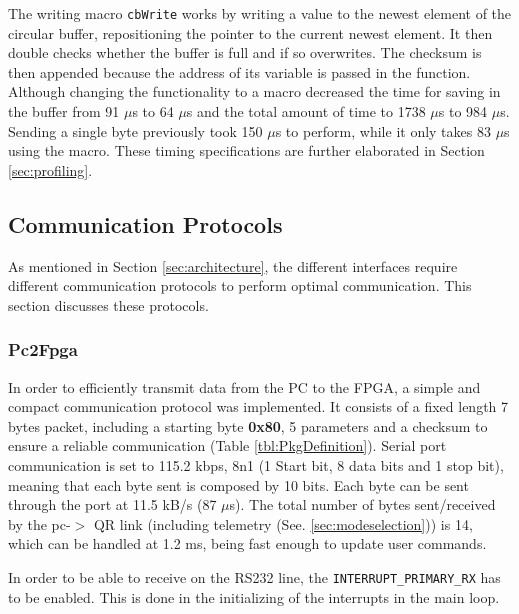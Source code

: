 \documentclass{article}
\begin{document}
The writing macro \texttt{cbWrite} works by writing a value to the newest element of the circular buffer, repositioning the pointer to the current newest element. It then double checks whether the buffer is full and if so overwrites. The checksum is then appended because the address of its variable is passed in the function. Although changing the functionality to a macro decreased the time for saving in the buffer from 91 $\mu$s to 64 $\mu$s and the total amount of time to 1738 $\mu$s to 984 $\mu$s. Sending a single byte previously took 150 $\mu$s to perform, while it only takes 83 $\mu$s using the macro. These timing specifications are further elaborated in Section \ref{sec:profiling}.

\subsection{Communication Protocols}
\label{sec:communication}
As mentioned in Section \ref{sec:architecture}, the different interfaces require different communication protocols to perform optimal communication. This section discusses these protocols. 


\subsubsection{Pc2Fpga}
In order to efficiently transmit  data from the PC to the FPGA, a simple and compact communication protocol was implemented. It consists of a fixed length 7 bytes packet, including a starting byte \textbf{0x80}, 5 parameters and a checksum to ensure a reliable communication (Table \ref{tbl:PkgDefinition}). Serial port communication is set to 115.2 kbps, 8n1 (1 Start bit, 8 data bits and 1 stop bit), meaning that each byte sent is composed by 10 bits. Each byte can be sent through the port at 11.5 kB/s (87 $\mu$s). The total number of bytes sent/received by the pc-$>$ QR link (including telemetry (See. \ref{sec:modeselection})) is 14, which can be handled at 1.2 ms, being fast enough to update user commands.

In order to be able to receive on the RS232 line, the \texttt{INTERRUPT\_PRIMARY\_RX} has to be enabled. This is done in the initializing of the interrupts in the main loop. 
\end{document}
